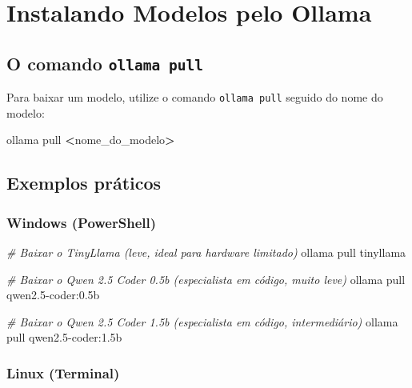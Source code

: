 \documentclass[
]{article}
\newenvironment{Shaded}{\begin{snugshade}}{\end{snugshade}}
\newcommand{\CommentTok}[1]{\textcolor[rgb]{0.56,0.35,0.01}{\textit{#1}}}
\newcommand{\ExtensionTok}[1]{#1}
\newcommand{\NormalTok}[1]{#1}
\newcommand{\OperatorTok}[1]{\textcolor[rgb]{0.81,0.36,0.00}{\textbf{#1}}}
\begin{document}
\section{Instalando Modelos pelo
Ollama}\label{instalando-modelos-pelo-ollama}

\subsection{\texorpdfstring{O comando
\texttt{ollama\ pull}}{O comando ollama pull}}\label{o-comando-ollama-pull}

Para baixar um modelo, utilize o comando \texttt{ollama\ pull} seguido
do nome do modelo:

\begin{Shaded}
\begin{Highlighting}[]
\ExtensionTok{ollama}\NormalTok{ pull }\OperatorTok{\textless{}}\NormalTok{nome\_do\_modelo}\OperatorTok{\textgreater{}}
\end{Highlighting}
\end{Shaded}

\subsection{Exemplos práticos}\label{exemplos-pruxe1ticos}

\subsubsection{Windows (PowerShell)}\label{windows-powershell}

\begin{Shaded}
\begin{Highlighting}[]
\CommentTok{\# Baixar o TinyLlama (leve, ideal para hardware limitado)}
\ExtensionTok{ollama}\NormalTok{ pull tinyllama}

\CommentTok{\# Baixar o Qwen 2.5 Coder 0.5b (especialista em código, muito leve)}
\ExtensionTok{ollama}\NormalTok{ pull qwen2.5{-}coder:0.5b}

\CommentTok{\# Baixar o Qwen 2.5 Coder 1.5b (especialista em código, intermediário)}
\ExtensionTok{ollama}\NormalTok{ pull qwen2.5{-}coder:1.5b}
\end{Highlighting}
\end{Shaded}

\subsubsection{Linux (Terminal)}\label{linux-terminal}
\end{document}
